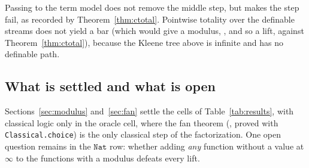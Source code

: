 \documentclass[acmsmall,review,screen]{acmart}\def\acmclass{}
\theoremstyle{plain}
\theoremstyle{definition}
\theoremstyle{remark}
\newcommand{\Nat}{\mathtt{Nat}}
\begin{document}
Passing to the term model does not remove the middle step, but makes the step fail,
as recorded by Theorem~\ref{thm:ctotal}.  Pointwise totality over the definable
streams does not yield a bar (which would give a modulus, , and so a lift,
against Theorem~\ref{thm:ctotal}), because the Kleene tree above is infinite and has no definable
path.

\subsection{What is settled and what is open}\label{sec:boundary}
Sections~\ref{sec:modulus} and~\ref{sec:fan} settle the cells of Table~\ref{tab:results},
with classical logic only in the oracle cell, where the fan theorem
(, proved with \texttt{Classical.choice}) is the only classical step of
the factorization.  One open question remains in the $\Nat$ row: whether adding
\emph{any} function without a value at $\infty$ to the functions with a modulus defeats every lift.

\end{document}
